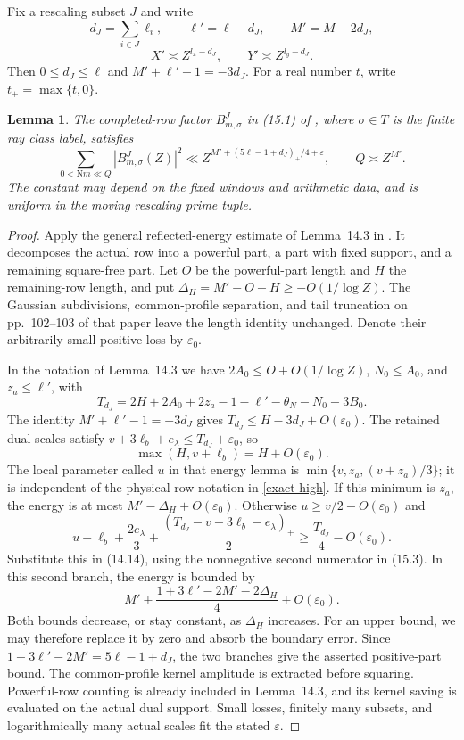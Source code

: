 \documentclass[10pt,reqno,a4paper]{amsart}
\newtheorem{lemma}[theorem]{Lemma}
\theoremstyle{remark}
\newcommand{\N}{\mathrm N}
\newcommand{\eps}{\varepsilon}
\begin{document}
Fix a rescaling subset $J$ and write
\[
 d_J=\sum_{i\in J}\ell_i,\qquad
 \ell'=\ell-d_J,\qquad M'=M-2d_J,
\]
\[
 X'\asymp Z^{l_x-d_J},\qquad Y'\asymp Z^{l_y-d_J}.
\]
Then $0\le d_J\le\ell$ and $M'+\ell'-1=-3d_J$.
For a real number $t$, write $t_+=\max\{t,0\}$.

\begin{lemma}\label{row-energy}
The completed-row factor $B_{m,\sigma}^J$ in (15.1) of \cite{q30},
where $\sigma\in T$ is the finite ray class label, satisfies
\[
 \sum_{0<\N m\ll Q}|B_{m,\sigma}^J(Z)|^2
 \ll Z^{M'+(5\ell-1+d_J)_+/4+\eps},
 \qquad Q\asymp Z^{M'}.
\]
The constant may depend on the fixed windows and arithmetic data, and
is uniform in the moving rescaling prime tuple.
\end{lemma}

\begin{proof}
Apply the general reflected-energy estimate of Lemma~14.3 in
\cite{q30}. It decomposes the actual row into a powerful part, a part with fixed
support, and a remaining square-free part.
Let $O$ be the powerful-part length and $H$ the remaining-row length,
and put $\Delta_H=M'-O-H\ge-O(1/\log Z)$. The Gaussian subdivisions,
common-profile separation, and tail truncation on pp.~102--103 of that
paper leave the length identity unchanged. Denote their arbitrarily
small positive loss by $\eps_0$.

In the notation of Lemma~14.3 we have
$2A_0\le O+O(1/\log Z)$, $N_0\le A_0$, and $z_a\le\ell'$, with
\[
 T_{d_J}=2H+2A_0+2z_a-1-\ell'-\theta_N-N_0-3B_0.
\]
The identity $M'+\ell'-1=-3d_J$ gives
$T_{d_J}\le H-3d_J+O(\eps_0)$. The retained dual scales satisfy
$v+3\ell_b+e_\lambda\le T_{d_J}+\eps_0$, so
\[
                  \max(H,v+\ell_b)=H+O(\eps_0).
\]
The local parameter called $u$ in that energy lemma is
$\min\{v,z_a,(v+z_a)/3\}$; it is independent of the physical-row
notation in \eqref{exact-high}. If this minimum is $z_a$, the energy
is at most $M'-\Delta_H+O(\eps_0)$. Otherwise
$u\ge v/2-O(\eps_0)$ and
\[
 u+\ell_b+\frac{2e_\lambda}{3}
   +\frac{(T_{d_J}-v-3\ell_b-e_\lambda)_+}{2}
       \ge\frac{T_{d_J}}4-O(\eps_0).
\]
Substitute this in (14.14), using the nonnegative second numerator
in (15.3). In this second branch, the energy is bounded by
\[
 M'+\frac{1+3\ell'-2M'-2\Delta_H}{4}+O(\eps_0).
\]
Both bounds decrease, or stay constant, as $\Delta_H$ increases.
For an upper bound, we may therefore replace it by zero and absorb the
boundary error. Since
$1+3\ell'-2M'=5\ell-1+d_J$, the two branches give the asserted
positive-part bound. The common-profile kernel amplitude is extracted
before squaring. Powerful-row counting is already included in
Lemma~14.3, and its kernel saving is evaluated on the actual dual
support. Small losses, finitely many subsets, and logarithmically many
actual scales fit the stated $\eps$.


\end{proof}
\end{document}
